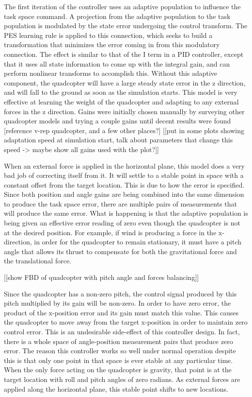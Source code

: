 \documentclass[letterpaper,12pt,titlepage,oneside,final]{book}
\begin{document}
The first iteration of the controller uses an adaptive population to influence the task space command. A projection from the adaptive population to the task population is modulated by the state error undergoing the control transform. The PES learning rule is applied to this connection, which seeks to build a transformation that minimizes the error coming in from this modulatory connection. The effect is similar to that of the I term in a PID controller, except that it uses all state information to come up with the integral gain, and can perform nonlinear transforms to accomplish this. Without this adaptive component, the quadcopter will have a large steady state error in the z direction, and will fall to the ground as soon as the simulation starts.
This model is very effective at learning the weight of the quadcopter and adapting to any external forces in the z direction. Gains were initially chosen manually by surveying other quadcopter models and trying a couple gains until decent results were found [reference v-rep quadcopter, and a few other places?]
[[put in some plots showing adaptation speed at simulation start, talk about parameters that change this speed -> maybe show all gains used with the plot?]]

When an external force is applied in the horizontal plane, this model does a very bad job of correcting itself from it. It will settle to a stable point in space with a constant offset from the target location. This is due to how the error is specified. Since both position and angle gains are being combined into the same dimension to produce the task space error, there are multiple pairs of measurements that will produce the same error. What is happening is that the adaptive population is being given an effective error reading of zero even though the quadcopter is not at the desired position. For example, if wind is producing a force in the x-direction, in order for the quadcopter to remain stationary, it must have a pitch angle that allows its thrust to compensate for both the gravitational force and the translational force.

[[show FBD of quadcopter with pitch angle and forces balancing]]

Since the quadcopter has a non-zero pitch, the control signal produced by this pitch multiplied by its gain will be non-zero. In order to have zero error, the product of the x-position error and its gain must match this value. This causes the quadcopter to move away from the target x-position in order to maintain zero control error. This is an undesirable side-effect of this controller design. In fact, there is a whole space of angle-position measurement pairs that produce zero error. The reason this controller works so well under normal operation despite this is that only one point in that space is ever stable at any particular time. When the only force acting on the quadcopter is gravity, that point is at the target location with roll and pitch angles of zero radians. As external forces are applied along the horizontal plane, this stable point shifts to new locations.
\end{document}
